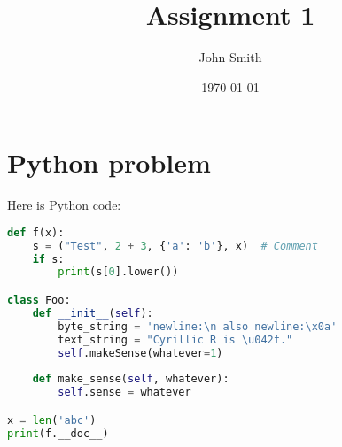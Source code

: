 \documentclass{modern}
\institute{University of Caen}
\date{\today}
\author{John Smith}
\title{Assignment 1}
\begin{document}
\thispagestyle{plain}

\makeheader

\section{Python problem}

Here is Python code:

\begin{lstlisting}[language=Python]
def f(x):
	s = ("Test", 2 + 3, {'a': 'b'}, x)  # Comment
	if s:
		print(s[0].lower())

class Foo:
	def __init__(self):
		byte_string = 'newline:\n also newline:\x0a'
		text_string = "Cyrillic R is \u042f."
		self.makeSense(whatever=1)
	
	def make_sense(self, whatever):
		self.sense = whatever

x = len('abc')
print(f.__doc__)
\end{lstlisting}

\lipsum[1]
\end{document}
